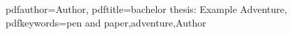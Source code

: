\newcommand{\adventurename}{Example Adventure}

\newcommand{\mainauthor}{Author}
\newcommand{\coauthor}{Coauthor}

\hypersetup
{
	pdfauthor={\mainauthor},
	pdftitle={bachelor thesis: \adventurename},
	pdfkeywords={pen and paper,adventure,\mainauthor}
}

